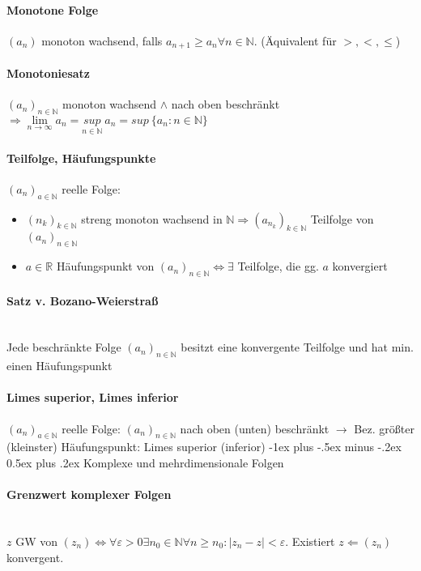 \documentclass[paper=a3,paper=landscape, fontsize=9pt,DIV=25]{scrartcl}
\makeatletter
\newcommand{\real}{{\mathbb{R}}}
\newcommand{\nat}{\mathbb{N}}
\newcommand{\aseq}{(a_n)_{n \in \nat}}
\renewcommand{\section}{\@startsection{section}{1}{0mm}%
                                {-1ex plus -.5ex minus -.2ex}%
                                {0.5ex plus .2ex}%
                                {\normalfont\large\bfseries}}
\makeatother
\begin{document}
\begin{multicols*}{4}
		\paragraph{Monotone Folge}
			$(a_n)$ monoton wachsend, falls $a_{n+1} \geq a_n \forall n \in \nat$. (Äquivalent für $>,<,\leq$)
		\paragraph{Monotoniesatz}
			$\aseq$ monoton wachsend $\wedge$ nach oben beschränkt $\Rightarrow \lim\limits_{n \rightarrow \infty} a_n = \underset{n \in \nat}{sup}\:a_n = sup\:\{a_n:n \in \nat\}$
		\paragraph{Teilfolge, Häufungspunkte}
			$(a_n)_{a \in \nat}$ reelle Folge:
			\begin{itemize}
			\item $(n_k)_{k \in \nat}$ streng monoton wachsend in $\nat \Rightarrow (a_{n_k})_{k \in \nat}$ Teilfolge von $\aseq$
			\item $a \in \real$ Häufungspunkt von $\aseq \Leftrightarrow \exists$ Teilfolge, die gg. $a$ konvergiert
			\end{itemize}
		\paragraph{Satz v. Bozano-Weierstraß}\hspace{0pt} \\
		Jede beschränkte Folge $\aseq$ besitzt eine konvergente Teilfolge und hat min. einen Häufungspunkt
		\paragraph{Limes superior, Limes inferior}
		$(a_n)_{a \in \nat}$ reelle Folge: $\aseq$ nach oben (unten) beschränkt $\rightarrow$ Bez. größter (kleinster) Häufungspunkt: Limes superior (inferior)
	\section{Komplexe und mehrdimensionale Folgen}
		\paragraph{Grenzwert komplexer Folgen}\hspace{0pt} \\
		$z$ GW von $(z_n) \Leftrightarrow \forall \varepsilon > 0 \exists n_0 \in \nat \forall n \geq n_0: |z_n - z| < \varepsilon$. Existiert $z \Leftarrow (z_n)$ konvergent.

\end{multicols*}
\end{document}
